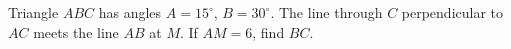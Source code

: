 Triangle $ABC$ has angles $A=15^\circ$, $B=30^\circ$. The line through $C$ perpendicular to $AC$ meets the line $AB$ at $M$. If $AM=6$, find $BC$.
